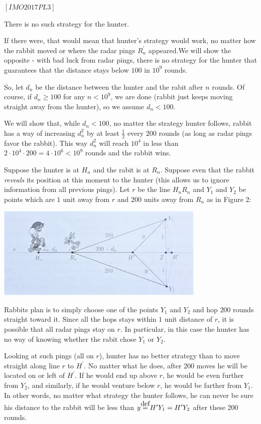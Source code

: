 \begin{problem}
$[IMO2017PL3]$


There is no such strategy for the hunter.

If there were, that would mean that hunter's strategy would work, no matter how the rabbit moved or where the radar pings $R^\prime_n$ appeared.We will show the opposite - with bad luck from radar pings, there is no strategy for the hunter that guarantees that the distance stays below $100$ in $10^9$ rounds.

So, let $d_n$ be the distance between the hunter and the rabit after $n$ rounds. Of course, if $d_n \ge 100$ for any $n < 10^9$, we are done (rabbit just keeps moving straight away from the hunter), so we assume $d_n <100$. 

We will show that, while $d_n < 100$, no matter the strategy hunter follows, rabbit has a way of increasing $d_n ^2$ by at least $\frac{1}{2}$ every $200$ rounds (as long as radar pings favor the rabbit). This way $d_n^2$ will reach $10^4$ in less than $2 \cdot 10^4 \cdot 200 = 4 \cdot 10^6 < 10^9$ rounds and the rabbit wins. 

Suppose the hunter is at $H_n$ and the rabit is at $R_n$. Suppose even that the rabbit \textit{reveals} its position at this moment to the hunter (this allows us to ignore information from all previous pings). Let $r$ be the line $H_n R_n$ and $Y_1$ and $Y_2$ be points which are $1$ unit away from $r$ and $200$ units away from $R_n$ as in Figure 2:
\begin{center}
\includegraphics[width=10cm]{Fig2.jpg}
\end{center}

Rabbits plan is to simply choose one of the points $Y_1$ and $Y_2$ and hop $200$ rounds straight toward it. Since all the hops stays within $1$ unit distance of $r$, it is possible that all radar pings stay on $r$. In particular, in this case the hunter has no way of knowing whether the rabit chose $Y_1$ or $Y_2$.

Looking at such pings (all on $r$), hunter has no better strategy than to move straight along line $r$ to $H^\prime$. No matter what he does, after $200$ moves he will be located on or left of $H^\prime$. If he would end up above $r$, he would be even further from $Y_2$, and similarly, if he would venture below $r$, he would be farther from $Y_1$. In other words, no matter what strategy the hunter follows, he can never be sure his distance to the rabbit will be less than $y \myeq H^\prime Y_1= H^\prime Y_2$ after these $200$ rounds. 


\end{problem}
